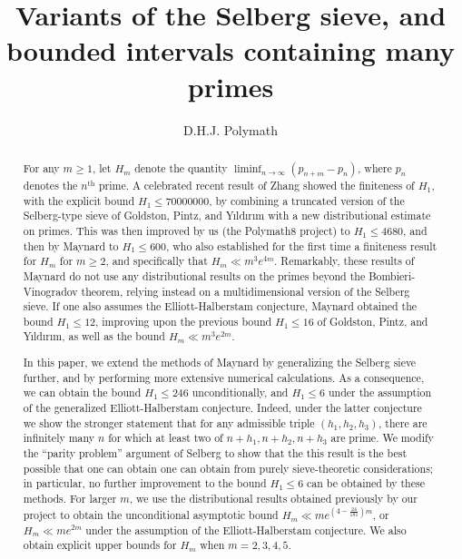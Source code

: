 \documentclass[12pt,a4paper,reqno]{amsart}
\numberwithin{equation}{section}
\theoremstyle{plain}
\theoremstyle{definition}
\begin{document}
\title[Bounded intervals with many primes]{Variants of the Selberg sieve, and bounded intervals containing many primes}

\author{D.H.J. Polymath}
\address{http://michaelnielsen.org/polymath1/index.php}

\begin{abstract}  For any $m \geq 1$, let $H_m$ denote the quantity $\liminf_{n \to \infty} (p_{n+m}-p_n)$, where $p_n$ denotes the $n^{\operatorname{th}}$ prime.  A celebrated recent result of Zhang showed the finiteness of $H_1$, with the explicit bound $H_1 \leq \num{70000000}$, by combining a truncated version of the Selberg-type sieve of Goldston, Pintz, and Y{\i}ld{\i}r{\i}m with a new distributional estimate on primes.  This was then improved by us (the Polymath8 project) to $H_1 \leq \num{4680}$, and then by Maynard to $H_1 \leq \num{600}$, who also established for the first time a finiteness result for $H_m$ for $m \geq 2$, and specifically that $H_m \ll m^3 e^{4m}$.  Remarkably, these results of Maynard do not use any distributional results on the primes beyond the Bombieri-Vinogradov theorem, relying instead on a multidimensional version of the Selberg sieve.  If one also assumes the Elliott-Halberstam conjecture, Maynard obtained the bound $H_1 \leq 12$, improving upon the previous bound $H_1 \leq 16$ of Goldston, Pintz, and Y{\i}ld{\i}r{\i}m, as well as the bound $H_m \ll m^3 e^{2m}$.

In this paper, we extend the methods of Maynard by generalizing the Selberg sieve further, and by performing more extensive numerical calculations.  As a consequence, we can obtain the bound $H_1 \leq \num{246}$ unconditionally, and $H_1 \leq 6$ under the assumption of the generalized Elliott-Halberstam conjecture.  Indeed, under the latter conjecture we show the stronger statement that for any admissible triple $(h_1,h_2,h_3)$, there are infinitely many $n$ for which at least two of $n+h_1,n+h_2,n+h_3$ are prime.  We modify the ``parity problem'' argument of Selberg to show that the this result is the best possible that one can obtain one can obtain from purely sieve-theoretic considerations; in particular, no further improvement to the bound $H_1 \leq 6$ can be obtained by these methods.  For larger $m$, we use the distributional results obtained previously by our project to obtain the unconditional asymptotic bound $H_m \ll m e^{(4-\frac{24}{181})m}$, or $H_m \ll m e^{2m}$ under the assumption of the Elliott-Halberstam conjecture.  We also obtain explicit upper bounds for $H_m$ when $m=2,3,4,5$.
\end{abstract}


\maketitle










\appendix

%
%

\end{document}
